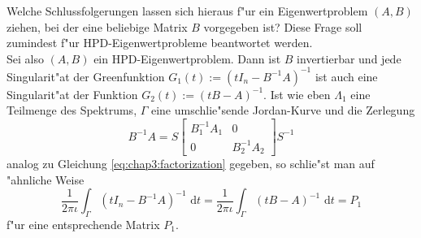 Welche Schlussfolgerungen lassen sich hieraus f"ur ein Eigenwertproblem $(A,B)$ ziehen, bei der eine beliebige Matrix $B$ vorgegeben ist? Diese Frage soll zumindest f"ur HPD-Eigenwertprobleme beantwortet werden.\\

Sei also $(A,B)$ ein HPD-Eigenwertproblem. Dann ist $B$ invertierbar und jede Singularit"at der Greenfunktion $G_1(t) := (t I_n - B^{-1}A)^{-1}$
ist auch eine Singularit"at der Funktion $G_2(t):=(t B - A)^{-1}$. Ist wie eben $\Lambda_1$ eine Teilmenge des Spektrums, $\Gamma$ eine umschlie"sende Jordan-Kurve und die Zerlegung
\[
B^{-1}A = S\begin{bmatrix} B^{-1}_1 A_1 & 0 \\ 0 & B^{-1}_2 A_2 \end{bmatrix} S^{-1}
\]
analog zu Gleichung \ref{eq:chap3:factorization} gegeben, so schlie"st man auf "ahnliche Weise
\[
\frac{1}{2\pi\iota}\int_\Gamma (t I_n - B^{-1}A)^{-1} \text{ d}t =
\frac{1}{2\pi\iota}\int_\Gamma (t B - A)^{-1} \text{ d}t
= P_1
\]
f"ur eine entsprechende Matrix $P_1$.




